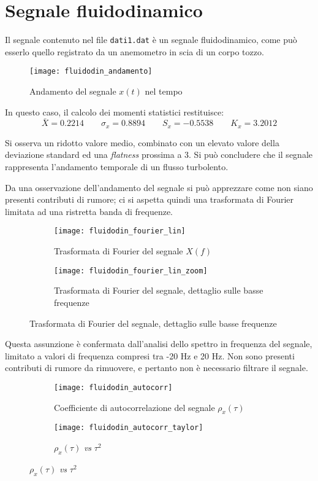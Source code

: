 \documentclass{article} %
\begin{document}
\section{Segnale fluidodinamico}
Il segnale contenuto nel file \texttt{dati1.dat} è un segnale fluidodinamico, come può esserlo quello registrato da un anemometro in scia di un corpo tozzo.\par
\begin{figure}[h!]
	\centering
	\texttt{[image: fluidodin\_andamento]}
	\caption{Andamento del segnale $x(t)$ nel tempo}
\end{figure}
In questo caso, il calcolo dei momenti statistici restituisce:
$$ \bar{X} = 0.2214 \qquad \sigma_{x} = 0.8894 \qquad S_{x} = -0.5538 \qquad K_{x} =  3.2012 $$\par
Si osserva un ridotto valore medio, combinato con un elevato valore della deviazione standard ed una \textit{flatness} prossima a 3. Si può concludere che il segnale rappresenta l'andamento temporale di un flusso turbolento.\par
Da una osservazione dell'andamento del segnale si può apprezzare come non siano presenti contributi di rumore; ci si aspetta quindi una trasformata di Fourier limitata ad una ristretta banda di frequenze.
\begin{figure}[h!]
	\begin{subfigure}{0.5\textwidth}
		\texttt{[image: fluidodin\_fourier\_lin]}
		\caption{Trasformata di Fourier del segnale $X(f)$}
	\end{subfigure}
	\begin{subfigure}{0.5\textwidth}
		\texttt{[image: fluidodin\_fourier\_lin\_zoom]}
		\caption{Trasformata di Fourier del segnale, dettaglio sulle basse frequenze}
	\end{subfigure}
\end{figure}\par
Questa assunzione è confermata dall'analisi dello spettro in frequenza del segnale, limitato a valori di frequenza compresi tra -20 Hz e 20 Hz. Non sono presenti contributi di rumore da rimuovere, e pertanto non è necessario filtrare il segnale.\par
\begin{figure}[h!]
	\begin{subfigure}{0.5\textwidth}
		\texttt{[image: fluidodin\_autocorr]}
		\caption{Coefficiente di autocorrelazione del segnale $\rho_{x}(\tau)$}
	\end{subfigure}
	\begin{subfigure}{0.5\textwidth}
		\texttt{[image: fluidodin\_autocorr\_taylor]}
		\caption{$\rho_{x}(\tau)$ \textit{vs} $\tau^2$}
	\end{subfigure}
\end{figure}\par
\end{document}
